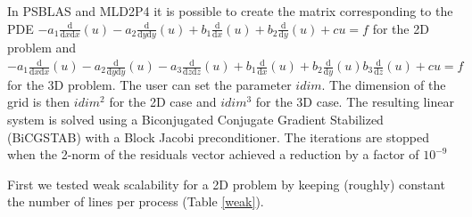 \documentclass{IOS-Book-Article}
\begin{document}
In PSBLAS and MLD2P4 it is possible to create the matrix corresponding to the PDE $
-a_1\frac{\mathrm d}{\mathrm d x \mathrm d x} \left(u \right) -a_2\frac{\mathrm d}{\mathrm d y \mathrm d y} \left(u \right) +b_1\frac{\mathrm d}{\mathrm d x} \left(u \right) +b_2\frac{\mathrm d}{\mathrm d y} \left(u \right) +cu = f
$ for the 2D problem and $
-a_1\frac{\mathrm d}{\mathrm d x \mathrm d x} \left(u \right) -a_2\frac{\mathrm d}{\mathrm d y \mathrm d y} \left(u \right) -a_3\frac{\mathrm d}{\mathrm d z \mathrm d z} \left(u \right) +b_1\frac{\mathrm d}{\mathrm d x} \left(u \right) +b_2\frac{\mathrm d}{\mathrm d y} \left(u \right) b_3\frac{\mathrm d}{\mathrm d z} \left(u \right)
 + cu = f$ for the 3D problem. The user can set the parameter $idim$. The dimension of the grid is then $idim^2$ for the 2D case and $idim^3$ for the 3D case.
 The resulting linear system is solved using a Biconjugated Conjugate Gradient Stabilized (BiCGSTAB) with a Block Jacobi preconditioner. The iterations are stopped when the 2-norm of the residuals vector achieved a reduction by a factor of $10^{-9}$
 
First we tested weak scalability for a 2D problem by keeping (roughly) constant the number of lines per process (Table \ref{weak}). 
\end{document}
